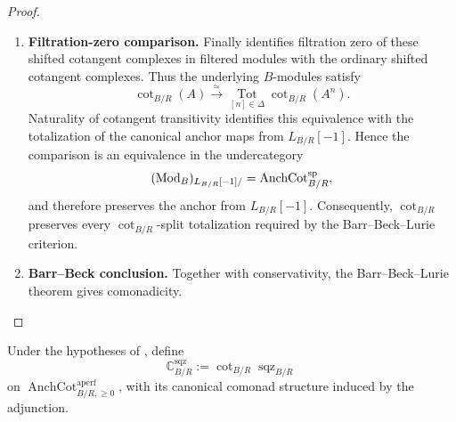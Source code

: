 \begin{proof}
\begin{enumerate}[label=\textup{(\arabic*)}]
    For the source,  makes the
    augmentation module \(B\) almost perfect over \(F^\bullet C\). The
    augmentation is pointwise surjective on \(\pi_0\), so
     makes
    \(L_{B/F^\bullet C}[-1]\) connective and almost perfect as a filtered
    \(B\)-module. The coefficient algebra \(B\), concentrated in filtration
    degree zero, is complete; hence
     makes the source complete.
    Since \(\gamma\) is an associated-graded equivalence between complete
    filtered modules,  makes
    \(\gamma\) an equivalence.
    \item \textbf{Filtration-zero comparison.}
    Finally
     identifies filtration zero of
    these shifted cotangent complexes in filtered modules with the ordinary shifted cotangent complexes.
    Thus the underlying \(B\)-modules satisfy
    \[
        \operatorname{cot}_{B/R}(A)
        \xrightarrow{\simeq}
        \operatorname*{Tot}_{[n]\in\Delta}
        \operatorname{cot}_{B/R}(A^n).
    \]
    Naturality of cotangent transitivity identifies this equivalence with the
    totalization of the canonical anchor maps from \(L_{B/R}[-1]\). Hence the
    comparison is an equivalence in the undercategory
    \[
        (\operatorname{Mod}_B)_{L_{B/R}[-1]/}
        =
        \operatorname{AnchCot}^{\mathrm{sp}}_{B/R},
    \]
    and therefore preserves the anchor from \(L_{B/R}[-1]\). Consequently,
    \(\operatorname{cot}_{B/R}\) preserves every
    \(\operatorname{cot}_{B/R}\)-split totalization required by the
    Barr--Beck--Lurie criterion.
    \item \textbf{Barr--Beck conclusion.}
    Together with conservativity, the Barr--Beck--Lurie theorem gives
    comonadicity.
\end{enumerate}
\end{proof}

\begin{definition}
\label{def:cotangent-square-zero-comonad}
Under the hypotheses of
, define
\[
    \mathbb C^{\mathrm{sqz}}_{B/R}
    :=
    \operatorname{cot}_{B/R}
    \operatorname{sqz}_{B/R}
\]
on \(\operatorname{AnchCot}^{\mathrm{aperf}}_{B/R,\geq0}\), with its canonical
comonad structure induced by the adjunction.
\end{definition}

